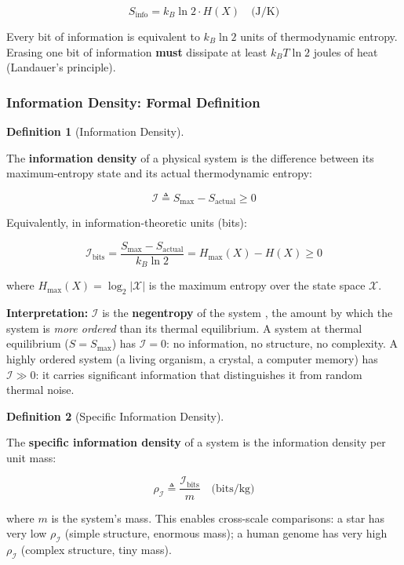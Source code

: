 \documentclass[11pt]{article}
\theoremstyle{plain}
\theoremstyle{definition}
\newtheorem{definition}{Definition}
\theoremstyle{remark}
\let\origsubsubsection\subsubsection
\renewcommand{\subsubsection}{\needspace{4\baselineskip}\origsubsubsection}
\begin{document}
\[S_{\text{info}} = k_B \ln 2 \cdot H(X) \quad \text{(J/K)}\]

Every bit of information is equivalent to \(k_B \ln 2\) units of
thermodynamic entropy. Erasing one bit of information \textbf{must}
dissipate at least \(k_B T \ln 2\) joules of heat (Landauer's
principle).

\subsubsection{Information Density: Formal
Definition}\label{information-density-formal-definition}

\begin{definition}[Information Density]
\label{def-information-density}

The \textbf{information density} of a physical system is the difference between its maximum-entropy state and its actual thermodynamic entropy:

$$\mathcal{I} \triangleq S_{\max} - S_{\text{actual}} \geq 0$$

Equivalently, in information-theoretic units (bits):

$$\mathcal{I}_{\text{bits}} = \frac{S_{\max} - S_{\text{actual}}}{k_B \ln 2} = H_{\max}(X) - H(X) \geq 0$$

where $H_{\max}(X) = \log_2 |\mathcal{X}|$ is the maximum entropy over the state space $\mathcal{X}$.
\end{definition}

\textbf{Interpretation:} \(\mathcal{I}\) is the \textbf{negentropy} of
the system \citep{Brillouin1962}, the amount by which the system is
\emph{more ordered} than its thermal equilibrium. A system at thermal
equilibrium (\(S = S_{\max}\)) has \(\mathcal{I} = 0\): no information,
no structure, no complexity. A highly ordered system (a living organism,
a crystal, a computer memory) has \(\mathcal{I} \gg 0\): it carries
significant information that distinguishes it from random thermal noise.

\begin{definition}[Specific Information Density]
\label{def-specific-information-density}

The \textbf{specific information density} of a system is the information density per unit mass:

$$\rho_{\mathcal{I}} \triangleq \frac{\mathcal{I}_{\text{bits}}}{m} \quad \text{(bits/kg)}$$

where $m$ is the system's mass. This enables cross-scale comparisons: a star has very low $\rho_{\mathcal{I}}$ (simple structure, enormous mass); a human genome has very high $\rho_{\mathcal{I}}$ (complex structure, tiny mass).
\end{definition}
\end{document}
